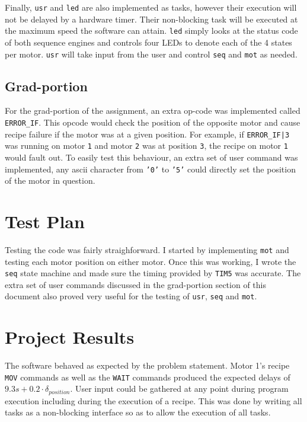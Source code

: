 \documentclass[CMPE]{KGCOEReport}
\def\code#1{\texttt{#1}}
\begin{document}
	Finally, \code{usr} and \code{led} are also implemented as tasks, however
	their execution will not be delayed by a hardware timer. Their non-blocking
	task will be executed at the maximum speed the software can attain. \code{led}
	simply looks at the status code of both sequence engines and controls four
	LEDs to denote each of the 4 states per motor. \code{usr} will take input
	from the user and control \code{seq} and \code{mot} as needed.

	\subsection*{Grad-portion}

	For the grad-portion of the assignment, an extra op-code was implemented
	called \code{ERROR\_IF}. This opcode would check the position of the opposite
	motor and cause recipe failure if the motor was at a given position. For
	example, if \code{ERROR\_IF|3} was running on motor \code{1} and motor
	\code{2} was at position \code{3}, the recipe on motor \code{1} would fault
	out. To easily test this behaviour, an extra set of user command was
	implemented, any ascii character from \code{'0'} to \code{'5'} could directly
	set the position of the motor in question.

    \section*{Test Plan}

    Testing the code was fairly straighforward. I started by implementing
   	\code{mot} and testing each motor position on either motor. Once this
   	was working, I wrote the \code{seq} state machine and made sure the timing
   	provided by \code{TIM5} was accurate. The extra set of user commands
   	discussed in the grad-portion section of this document also proved very
   	useful for the testing of \code{usr}, \code{seq} and \code{mot}.

    \section*{Project Results}

    The software behaved as expected by the problem statement. Motor 1's
    recipe \code{MOV} commands as well as the \code{WAIT} commands produced
    the expected delays of $9.3s + 0.2 \cdot \delta_{position}$. User input
    could be gathered at any point during program execution including during
    the execution of a recipe. This was done by writing all tasks as a
    non-blocking interface so as to allow the execution of all tasks.
\end{document}
